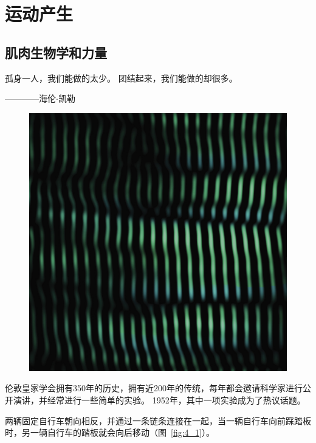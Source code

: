 \part{运动产生}

\chapter{肌肉生物学和力量}\label{chap:chap4}


孤身一人，我们能做的太少。
团结起来，我们能做的却很多。
\begin{flushright}
	————海伦$\cdot$凯勒
\end{flushright}


\begin{figure}[!htb]
	\centering
	\includegraphics[width=1.0\linewidth]{chap4/4_0}
	\caption*{ \label{fig:4_0}}
\end{figure}


伦敦皇家学会拥有350年的历史，拥有近200年的传统，每年都会邀请科学家进行公开演讲，并经常进行一些简单的实验。
1952年，其中一项实验成为了热议话题。


两辆固定自行车朝向相反，并通过一条链条连接在一起，当一辆自行车向前踩踏板时，另一辆自行车的踏板就会向后移动（图~\ref{fig:4_1}）。


